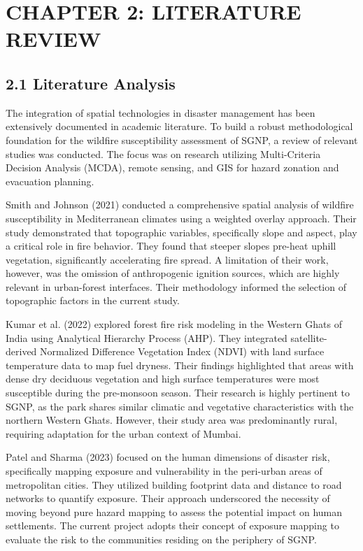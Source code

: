 \documentclass[12pt,a4paper]{article}
\begin{document}
\clearpage
\section*{CHAPTER 2: LITERATURE REVIEW}


\subsection*{2.1 Literature Analysis}

The integration of spatial technologies in disaster management has been extensively documented in academic literature. To build a robust methodological foundation for the wildfire susceptibility assessment of SGNP, a review of relevant studies was conducted. The focus was on research utilizing Multi-Criteria Decision Analysis (MCDA), remote sensing, and GIS for hazard zonation and evacuation planning.


Smith and Johnson (2021) conducted a comprehensive spatial analysis of wildfire susceptibility in Mediterranean climates using a weighted overlay approach. Their study demonstrated that topographic variables, specifically slope and aspect, play a critical role in fire behavior. They found that steeper slopes pre-heat uphill vegetation, significantly accelerating fire spread. A limitation of their work, however, was the omission of anthropogenic ignition sources, which are highly relevant in urban-forest interfaces. Their methodology informed the selection of topographic factors in the current study.


Kumar et al. (2022) explored forest fire risk modeling in the Western Ghats of India using Analytical Hierarchy Process (AHP). They integrated satellite-derived Normalized Difference Vegetation Index (NDVI) with land surface temperature data to map fuel dryness. Their findings highlighted that areas with dense dry deciduous vegetation and high surface temperatures were most susceptible during the pre-monsoon season. Their research is highly pertinent to SGNP, as the park shares similar climatic and vegetative characteristics with the northern Western Ghats. However, their study area was predominantly rural, requiring adaptation for the urban context of Mumbai.


Patel and Sharma (2023) focused on the human dimensions of disaster risk, specifically mapping exposure and vulnerability in the peri-urban areas of metropolitan cities. They utilized building footprint data and distance to road networks to quantify exposure. Their approach underscored the necessity of moving beyond pure hazard mapping to assess the potential impact on human settlements. The current project adopts their concept of exposure mapping to evaluate the risk to the communities residing on the periphery of SGNP.
\end{document}
